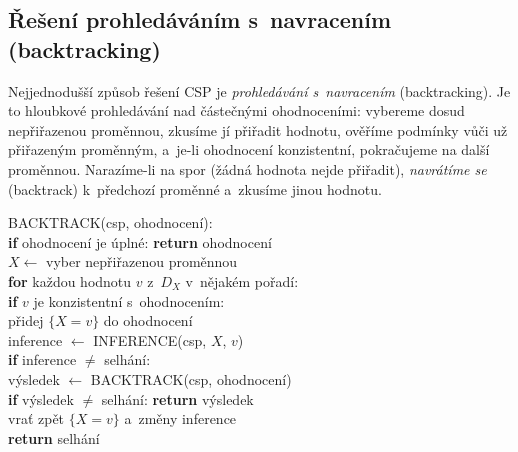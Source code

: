 \subsection{Řešení prohledáváním s~navracením (backtracking)}

Nejjednodušší způsob řešení CSP je \emph{prohledávání s~navracením} (backtracking). Je to hloubkové prohledávání nad částečnými ohodnoceními: vybereme dosud nepřiřazenou proměnnou, zkusíme jí přiřadit hodnotu, ověříme podmínky vůči už přiřazeným proměnným, a~je-li ohodnocení konzistentní, pokračujeme na další proměnnou. Narazíme-li na spor (žádná hodnota nejde přiřadit), \emph{navrátíme se} (backtrack) k~předchozí proměnné a~zkusíme jinou hodnotu.

\begin{algo}
\ttfamily\small
BACKTRACK(csp, ohodnocení):\\
\hspace*{1.5em}\textbf{if} ohodnocení je úplné: \textbf{return} ohodnocení\\
\hspace*{1.5em}$X \leftarrow$ vyber nepřiřazenou proměnnou \\
\hspace*{1.5em}\textbf{for} každou hodnotu $v$ z~$D_X$ v~nějakém pořadí: \\
\hspace*{3em}\textbf{if} $v$ je konzistentní s~ohodnocením: \\
\hspace*{4.5em}přidej $\{X=v\}$ do ohodnocení\\
\hspace*{4.5em}inference $\leftarrow$ INFERENCE(csp, $X$, $v$) \\
\hspace*{4.5em}\textbf{if} inference $\neq$ selhání:\\
\hspace*{6em}výsledek $\leftarrow$ BACKTRACK(csp, ohodnocení)\\
\hspace*{6em}\textbf{if} výsledek $\neq$ selhání: \textbf{return} výsledek\\
\hspace*{4.5em}vrať zpět $\{X=v\}$ a~změny inference \\
\hspace*{1.5em}\textbf{return} selhání
\end{algo}

